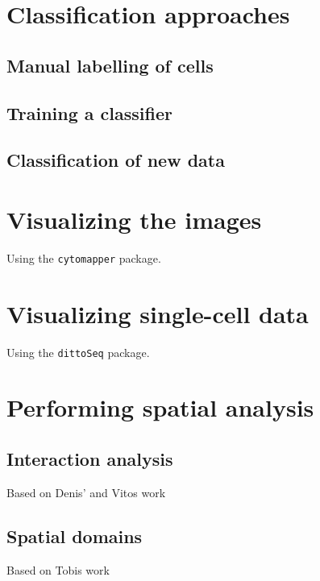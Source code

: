 \documentclass[
]{book}
\begin{document}
\hypertarget{classification-approaches}{%
\chapter{Classification approaches}\label{classification-approaches}}

\hypertarget{manual-labelling-of-cells}{%
\section{Manual labelling of cells}\label{manual-labelling-of-cells}}

\hypertarget{training-a-classifier}{%
\section{Training a classifier}\label{training-a-classifier}}

\hypertarget{classification-of-new-data}{%
\section{Classification of new data}\label{classification-of-new-data}}

\hypertarget{visualizing-the-images}{%
\chapter{Visualizing the images}\label{visualizing-the-images}}

Using the \texttt{cytomapper} package.

\hypertarget{visualizing-single-cell-data}{%
\chapter{Visualizing single-cell data}\label{visualizing-single-cell-data}}

Using the \texttt{dittoSeq} package.

\hypertarget{performing-spatial-analysis}{%
\chapter{Performing spatial analysis}\label{performing-spatial-analysis}}

\hypertarget{interaction-analysis}{%
\section{Interaction analysis}\label{interaction-analysis}}

Based on Denis' and Vitos work

\hypertarget{spatial-domains}{%
\section{Spatial domains}\label{spatial-domains}}

Based on Tobis work

  
\end{document}
